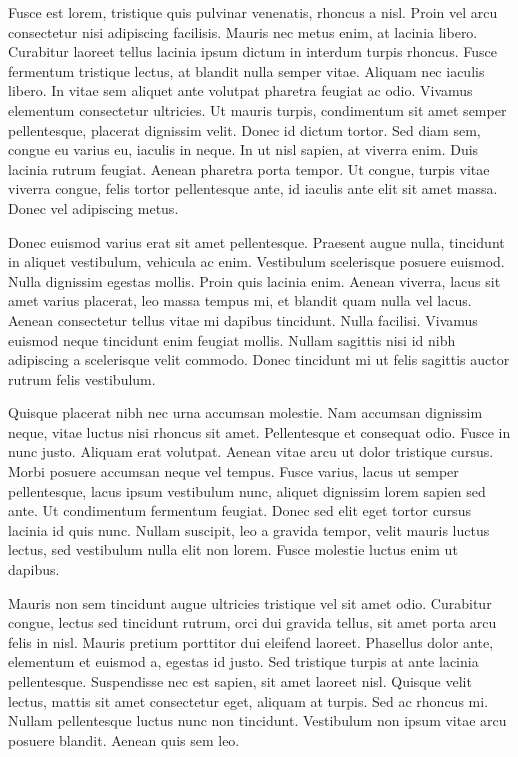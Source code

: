 Fusce est lorem, tristique quis pulvinar venenatis, rhoncus a nisl.
Proin vel arcu consectetur nisi adipiscing facilisis.
Mauris nec metus enim, at lacinia libero.
Curabitur laoreet tellus lacinia ipsum dictum in interdum turpis rhoncus.
Fusce fermentum tristique lectus, at blandit nulla semper vitae.
Aliquam nec iaculis libero.
In vitae sem aliquet ante volutpat pharetra feugiat ac odio.
Vivamus elementum consectetur ultricies.
Ut mauris turpis, condimentum sit amet semper pellentesque, placerat dignissim velit.
Donec id dictum tortor.
Sed diam sem, congue eu varius eu, iaculis in neque.
In ut nisl sapien, at viverra enim.
Duis lacinia rutrum feugiat.
Aenean pharetra porta tempor.
Ut congue, turpis vitae viverra congue, felis tortor pellentesque ante, id iaculis ante elit sit amet massa.
Donec vel adipiscing metus.

Donec euismod varius erat sit amet pellentesque.
Praesent augue nulla, tincidunt in aliquet vestibulum, vehicula ac enim.
Vestibulum scelerisque posuere euismod.
Nulla dignissim egestas mollis.
Proin quis lacinia enim.
Aenean viverra, lacus sit amet varius placerat, leo massa tempus mi, et blandit quam nulla vel lacus.
Aenean consectetur tellus vitae mi dapibus tincidunt.
Nulla facilisi.
Vivamus euismod neque tincidunt enim feugiat mollis.
Nullam sagittis nisi id nibh adipiscing a scelerisque velit commodo.
Donec tincidunt mi ut felis sagittis auctor rutrum felis vestibulum.

Quisque placerat nibh nec urna accumsan molestie.
Nam accumsan dignissim neque, vitae luctus nisi rhoncus sit amet.
Pellentesque et consequat odio.
Fusce in nunc justo.
Aliquam erat volutpat.
Aenean vitae arcu ut dolor tristique cursus.
Morbi posuere accumsan neque vel tempus.
Fusce varius, lacus ut semper pellentesque, lacus ipsum vestibulum nunc, aliquet dignissim lorem sapien sed ante.
Ut condimentum fermentum feugiat.
Donec sed elit eget tortor cursus lacinia id quis nunc.
Nullam suscipit, leo a gravida tempor, velit mauris luctus lectus, sed vestibulum nulla elit non lorem.
Fusce molestie luctus enim ut dapibus.

Mauris non sem tincidunt augue ultricies tristique vel sit amet odio.
Curabitur congue, lectus sed tincidunt rutrum, orci dui gravida tellus, sit amet porta arcu felis in nisl.
Mauris pretium porttitor dui eleifend laoreet.
Phasellus dolor ante, elementum et euismod a, egestas id justo.
Sed tristique turpis at ante lacinia pellentesque.
Suspendisse nec est sapien, sit amet laoreet nisl.
Quisque velit lectus, mattis sit amet consectetur eget, aliquam at turpis.
Sed ac rhoncus mi.
Nullam pellentesque luctus nunc non tincidunt.
Vestibulum non ipsum vitae arcu posuere blandit.
Aenean quis sem leo.

